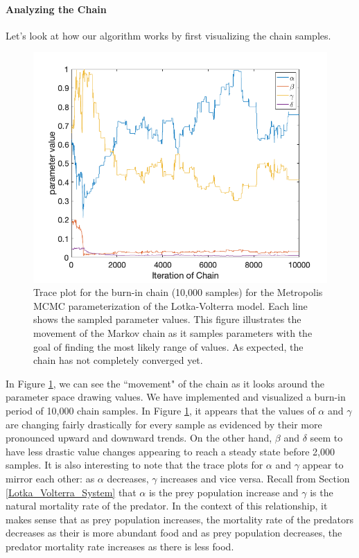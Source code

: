 \paragraph{Analyzing the Chain} \label{Analyzing_the_chain_Met}
Let's look at how our algorithm works by first visualizing the chain samples.
\begin{figure}[H]
    \centering
    \includegraphics[width=15cm]{MCMC_figs/met_lv_final/final_mh_burninchain.png}
    \caption{Trace plot for the burn-in chain (10,000 samples) for the Metropolis MCMC parameterization of the Lotka-Volterra model. Each line shows the sampled parameter values. This figure illustrates the movement of the Markov chain as it samples parameters with the goal of finding the most likely range of values. As expected, the chain has not completely converged yet.}
    \label{fig:1mcmc}
\end{figure}
In Figure \ref{fig:1mcmc}, we can see the ``movement" of the chain as it looks around the parameter space drawing values. We have implemented and visualized a burn-in period of 10,000 chain samples. In Figure \ref{fig:1mcmc}, it appears that the values of $\alpha$ and $\gamma$ are changing fairly drastically for every sample as evidenced by their more pronounced upward and downward trends. On the other hand, $\beta$ and $\delta$ seem to have less drastic value changes appearing to reach a steady state before 2,000 samples. It is also interesting to note that the trace plots for $\alpha$ and $\gamma$ appear to mirror each other: as $\alpha$ decreases, $\gamma$ increases and vice versa. Recall from Section \ref{Lotka_Volterra_System} that $\alpha$ is the prey population increase and $\gamma$ is the natural mortality rate of the predator. In the context of this relationship, it makes sense that as prey population increases, the mortality rate of the predators decreases as their is more abundant food and as prey population decreases, the predator mortality rate increases as there is less food.
